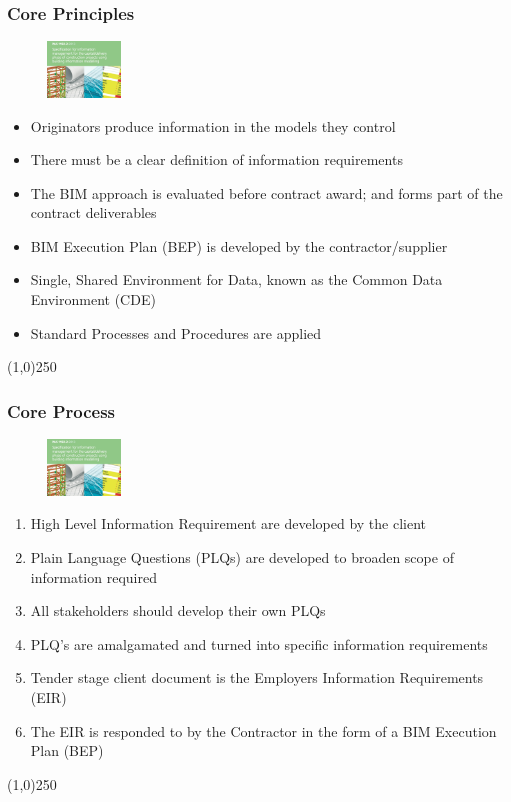 \begin{frame}
\frametitle{Core Principles}
\begin{figure}
	\centering
	\includegraphics[height=1.5cm]{./images/Pas1192P2Image.jpg}
\end{figure}
\begin{itemize}
	\item Originators produce information in the models they control
	\item There must be a clear definition of information requirements
	\item The BIM approach is evaluated before contract award; and forms part of the contract deliverables
	\item BIM Execution Plan (BEP) is developed by the contractor/supplier
	\item Single, Shared Environment for Data, known as the Common Data Environment (CDE)
	\item Standard Processes and Procedures are applied
\end{itemize}
\end{frame}
\begin{center}\line(1,0){250}\end{center}




\begin{frame}
\frametitle{Core Process}
\begin{figure}
	\centering
	\includegraphics[height=1.5cm]{./images/Pas1192P2Image.jpg}
\end{figure}
\begin{enumerate}
	\item High Level Information Requirement are developed by the client
	\item Plain Language Questions (PLQs) are developed to broaden scope of information required
	\item All stakeholders should develop their own PLQs
	\item PLQ's are amalgamated and turned into specific information requirements
	\item Tender stage client document is the Employers Information Requirements (EIR)
	\item The EIR is responded to by the Contractor in the form of a BIM Execution Plan (BEP)
\end{enumerate}
\end{frame}
\begin{center}\line(1,0){250}\end{center}





